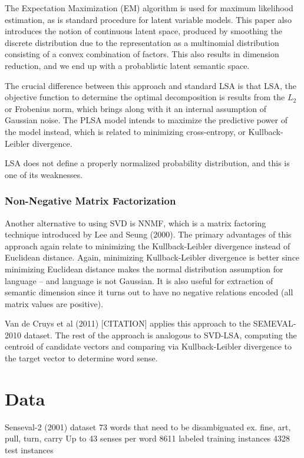 \documentclass[10pt, letterpaper]{article}
\begin{document}
	The Expectation Maximization (EM) algorithm is used for maximum likelihood estimation, as is standard procedure for latent variable models. This paper also introduces the notion of continuous latent space, produced by smoothing the discrete distribution due to the representation as a multinomial distribution
	consisting of a convex combination of factors. This also results in dimension reduction, and we end up with a probablistic latent semantic space. 

	The crucial difference between this approach and standard LSA is that LSA, the objective function to determine the optimal decomposition is results from the $L_2$ or Frobenius norm, which brings along with it an internal assumption of Gaussian noise. The PLSA model intends to maximize the predictive power of the model instead, which is related to minimizing cross-entropy, or Kullback-Leibler divergence. 

	LSA does not define a properly normalized probability distribution, and this is one of its weaknesses.

	\subsubsection{Non-Negative Matrix Factorization}
	Another alternative to using SVD is NNMF, which is a matrix factoring technique introduced by Lee and Seung  (2000). 
	The primary advantages of this approach again relate to minimizing the Kullback-Leibler divergence instead of Euclidean distance. 
	Again, minimizing Kullback-Leibler divergence is better since minimizing Euclidean distance makes the normal distribution assumption for language -- and language is not Gaussian.
	It is also useful for extraction of semantic dimension since it turns out to have no negative relations encoded (all matrix values are positive). 

	Van de Cruys et al (2011) [CITATION] applies this approach to the SEMEVAL-2010 dataset. The rest of the approach is analogous to SVD-LSA, computing the centroid  of candidate vectors and comparing via Kullback-Leibler divergence to the target vector to determine word sense. 

	\section{Data}
	Senseval-2 (2001) dataset
	73 words that need to be disambiguated
	         ex. fine, art, pull, turn, carry
	Up to 43 senses per word
	8611 labeled training instances
	4328 test instances	
\end{document}
